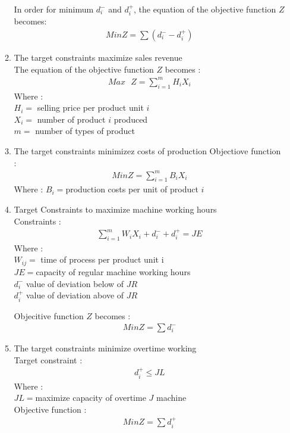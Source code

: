 \documentclass[a4paper, 12pt]{article}
\begin{document}
\begin{enumerate}[label={\alph*}]
\begin{enumerate}
				In order for minimum $d_i^-$ and $d_i^+$, the equation of the objective function $Z$ becomes:
				\begin{align}
				Min Z = \sum (d_i^- - d_i^+)
				\end{align}
				
				\item The target constraints maximize sales revenue\\
				The equation of the objective function $Z$ becomes  :
				\begin{align}
				Max \text{ } Z = \sum_{i=1}^{m}H_iX_i
				\end{align}
				Where :
				\\$H_i = $ selling price per product unit $i$
				\\$X_i = $ number of product $i$ produced
				\\$m = $ number of types of product\\
				
				\item The target constraints minimizez costs of production 
				Objectiove function :
				\begin{align}
				Min Z = \sum_{i=1}^{m}B_iX_i
				\end{align}
				Where :
				$B_i = $production costs per unit of product $i$
				
				\item Target Constraints to maximize  machine working hours\\
				Constraints : 
				\begin{align}
				\sum_{i=1}^{m}W_iX_i + d_i^- + d_i^+ = JE
				\end{align}
				Where : 
				\\$W_{ij} = $ time of process per product unit i
				\\$JE = $capacity of regular machine working hours
				\\$d_i^-$ value of deviation below of $JR$
				\\$d_i^+$ value of deviation above of $JR$
				
				Objecitive function $Z$ becomes :
				\begin{align}
				Min Z = \sum d_i^-
				\end{align}
				
				\item The target constraints minimize overtime working\\
				Target constraint :
				\begin{align}
				d_i^+ \leq JL
				\end{align}
				Where :
				\\$JL =$maximize capacity of  overtime $J$ machine\\
				Objective function :
				\begin{align}
				Min Z = \sum d_i^+
				\end{align} 
			\end{enumerate}
		

\end{enumerate}
\end{document}
